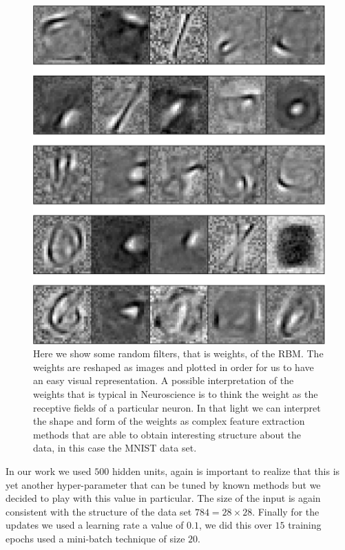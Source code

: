 \documentclass[11pt,a4paper]{article}
\begin{document}
 
\begin{center}
\begin{figure}[H]
\centering
\includegraphics[scale=.45]{final_filters.pdf} 
\caption{Here we show some random filters, that is weights, of the RBM. The weights are reshaped as images and plotted in order for us to have an easy visual representation. A possible interpretation of the weights that is typical in Neuroscience is to think the weight as the receptive fields of a particular neuron. In that light we can interpret the shape and form of the weights as complex feature extraction methods that are able to obtain interesting structure about the data, in this case the MNIST data set.}
\label{fig:rbm_filters}
\end{figure} 
\end{center}

In our work we used $500$ hidden units, again is important to realize that this is yet another hyper-parameter that can be tuned by known methods but we decided to play with this value in particular. The size of the input is again consistent with the structure of the data set $784 = 28 \times 28$. Finally for the updates we used a learning rate a value of $0.1$, we did this over $15$ training epochs used a mini-batch technique of size $20$.  
\end{document}
